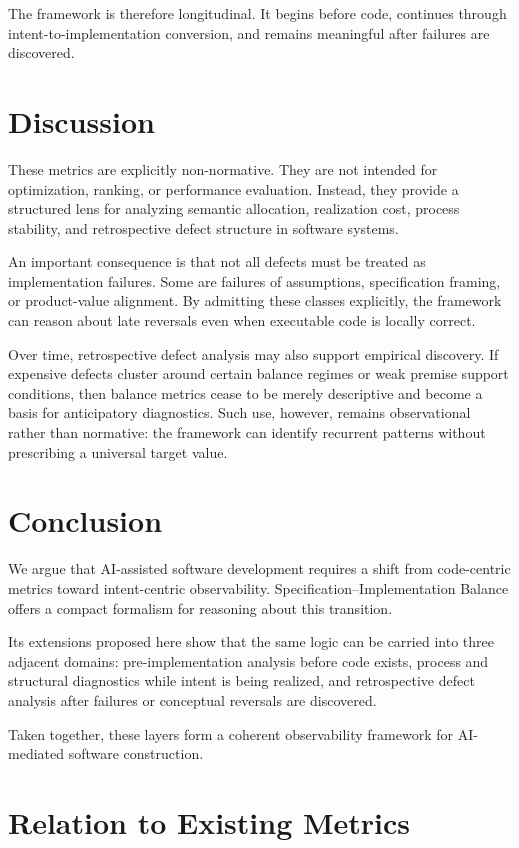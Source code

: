 \documentclass[twocolumn]{aastex701}
\begin{document}
The framework is therefore longitudinal.
It begins before code, continues through intent-to-implementation conversion,
and remains meaningful after failures are discovered.

\section{Discussion}

These metrics are explicitly non-normative.
They are not intended for optimization, ranking, or performance evaluation.
Instead, they provide a structured lens for analyzing
semantic allocation, realization cost, process stability,
and retrospective defect structure in software systems.

An important consequence is that not all defects must be treated
as implementation failures.
Some are failures of assumptions, specification framing,
or product-value alignment.
By admitting these classes explicitly, the framework can reason
about late reversals even when executable code is locally correct.

Over time, retrospective defect analysis may also support empirical discovery.
If expensive defects cluster around certain balance regimes
or weak premise support conditions, then balance metrics cease to be
merely descriptive and become a basis for anticipatory diagnostics.
Such use, however, remains observational rather than normative:
the framework can identify recurrent patterns without prescribing
a universal target value.

\section{Conclusion}

We argue that AI-assisted software development requires a shift
from code-centric metrics toward intent-centric observability.
Specification--Implementation Balance offers a compact formalism
for reasoning about this transition.

Its extensions proposed here show that the same logic can be carried
into three adjacent domains:
pre-implementation analysis before code exists,
process and structural diagnostics while intent is being realized,
and retrospective defect analysis after failures or conceptual reversals
are discovered.

Taken together, these layers form a coherent observability framework
for AI-mediated software construction.

\section{Relation to Existing Metrics}
\end{document}
